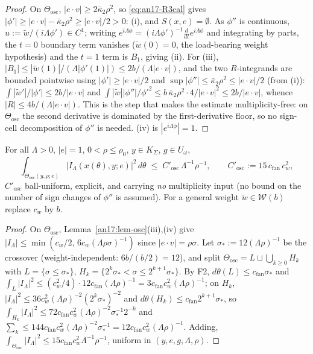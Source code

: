 \begin{proof}
On $\Theta_{\mathrm{osc}}$, $|e\cdot v|\ge2\bar\kappa_2\rho^2$, so
\eqref{eq:an17-R3cal} gives $|\phi'|\ge|e\cdot v|-\bar\kappa_2\rho^2\ge
|e\cdot v|/2>0$: (i), and $S(x,e)=\emptyset$. As $\phi''$ is continuous,
$u:=\tilde w/(i\Lambda\phi')\in C^1$; writing $e^{i\Lambda\phi}=
(i\Lambda\phi')^{-1}\tfrac{d}{dt}e^{i\Lambda\phi}$ and integrating by parts, the
$t=0$ boundary term vanishes ($\tilde w(0)=0$, the load-bearing weight
hypothesis) and the $t=1$ term is $B_1$, giving (ii). For (iii),
$|B_1|\le|\tilde w(1)|/(\Lambda|\phi'(1)|)\le 2b/(\Lambda|e\cdot v|)$, and the two
$R$-integrands are bounded pointwise using $|\phi'|\ge|e\cdot v|/2$ and
$\sup|\phi''|\le\bar\kappa_2\rho^2\le|e\cdot v|/2$ (from (i)):
$\int|\tilde w'|/|\phi'|\le 2b/|e\cdot v|$ and
$\int|\tilde w||\phi''|/\phi'^2\le b\,\bar\kappa_2\rho^2\cdot 4/|e\cdot v|^2\le
2b/|e\cdot v|$, whence $|R|\le 4b/(\Lambda|e\cdot v|)$. This is the step that
makes the estimate multiplicity-free: on $\Theta_{\mathrm{osc}}$ the second
derivative is dominated by the first-derivative floor, so no sign-cell
decomposition of $\phi''$ is needed. (iv) is $|e^{i\Lambda\phi}|=1$.
\end{proof}

\begin{proposition}\label{an17:prop-D2}
For all $\Lambda>0$, $|e|=1$, $0<\rho\le\rho_0$, $y\in K_\Sigma$, $g\in U_\omega$,
\begin{equation}\label{eq:an17-D2}
 \int_{\Theta_{\mathrm{osc}}(y,\rho;e)}\bigl|I_\Lambda(x(\theta),y;e)\bigr|^{2}
 \,d\theta\;\le\;C'_{\mathrm{osc}}\,\Lambda^{-1}\rho^{-1},\qquad
 C'_{\mathrm{osc}}:=15\,c_{\mathrm{fan}}\,c_w^{2},
\end{equation}
$C'_{\mathrm{osc}}$ ball-uniform, explicit, and carrying \emph{no} multiplicity
input (no bound on the number of sign changes of $\phi''$ is assumed). For a
general weight $\tilde w\in\mathcal W(b)$ replace $c_w$ by $b$.
\end{proposition}
\begin{proof}
On $\Theta_{\mathrm{osc}}$, Lemma~\ref{an17:lem-osc}(iii),(iv) give
$|I_\Lambda|\le\min(c_w/2,\,6c_w(\Lambda\rho\sigma)^{-1})$ since
$|e\cdot v|=\rho\sigma$. Let $\sigma_*:=12(\Lambda\rho)^{-1}$ be the crossover
(weight-independent: $6b/(b/2)=12$), and split
$\Theta_{\mathrm{osc}}=L\sqcup\bigcup_{k\ge0}H_k$ with $L=\{\sigma\le\sigma_*\}$,
$H_k=\{2^k\sigma_*<\sigma\le 2^{k+1}\sigma_*\}$. By F2, $d\theta(L)\le
c_{\mathrm{fan}}\sigma_*$ and $\int_L|I_\Lambda|^2\le(c_w^2/4)\cdot
12c_{\mathrm{fan}}(\Lambda\rho)^{-1}=3c_{\mathrm{fan}}c_w^2(\Lambda\rho)^{-1}$;
on $H_k$, $|I_\Lambda|^2\le 36c_w^2(\Lambda\rho)^{-2}(2^k\sigma_*)^{-2}$ and
$d\theta(H_k)\le c_{\mathrm{fan}}2^{k+1}\sigma_*$, so
$\int_{H_k}|I_\Lambda|^2\le 72c_{\mathrm{fan}}c_w^2(\Lambda\rho)^{-2}
\sigma_*^{-1}2^{-k}$ and $\sum_k\le 144c_{\mathrm{fan}}c_w^2(\Lambda\rho)^{-2}
\sigma_*^{-1}=12c_{\mathrm{fan}}c_w^2(\Lambda\rho)^{-1}$. Adding,
$\int_{\Theta_{\mathrm{osc}}}|I_\Lambda|^2\le15c_{\mathrm{fan}}c_w^2
\Lambda^{-1}\rho^{-1}$, uniform in $(y,e,g,\Lambda,\rho)$.
\end{proof}

